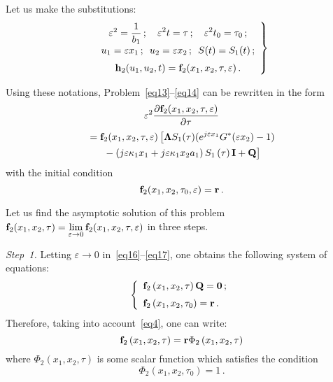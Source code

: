 \begin{multicols}{2}
Let us make the substitutions:
\begin{equation}
\left.
\begin{array}{c}
\varepsilon^2=\displaystyle\frac{\displaystyle 1\mathstrut}{\displaystyle b_1\mathstrut}\,;\quad
\varepsilon^2 t=\tau\,;\quad
\varepsilon^2 t_0=\tau_0\,;\\[6pt] 
u_1=\varepsilon x_1\,;\enskip 
u_2=\varepsilon x_2\,;\enskip 
S(t)=S_1(t)\,;\\[6pt] 
{\bf h}_2(u_1,u_2,t)={\bf f}_2(x_1,x_2,\tau,\varepsilon)\,.
\end{array}
\right\}
\label{eq15}
\end{equation}

Using these notations, Problem~\eqref{eq13}--\eqref{eq14} can be rewritten in the form
\begin{multline}
\varepsilon^2\fr{\partial {\bf f}_2(x_1,x_2,\tau,\varepsilon)}{\partial \tau}\\
{}=
{\bf{f}}_2(x_1,x_2,\tau,\varepsilon)\left[
\mathbf{\Lambda} S_1(\tau)(e^{j\varepsilon x_1}G^*(\varepsilon x_2)-1)\right. 
\\
\left.{} -\left( j\varepsilon\kappa_1x_1+j\varepsilon\kappa_1x_2a_1\right)
S_1\left( \tau\right) \mathbf{I}+ \mathbf{Q}
\vphantom{e^{j\varepsilon x_1}G^*(\varepsilon x_2)}
\right]
\label{eq16}
\end{multline}
with the initial condition
\begin{equation}
\label{eq17}
{\bf f}_2(x_1,x_2,\tau_0,\varepsilon)={\bf r}\,.
\end{equation}

Let us find the asymptotic solution of this problem 
${\bf f}_2(x_1,x_2,\tau)=
\lim\limits_{\varepsilon\to 0}{\bf f}_2(x_1,x_2,\tau,\varepsilon)$ in three steps.

\textit{Step~1.} Letting $\varepsilon\to 0$ in~\eqref{eq16}--\eqref{eq17}, 
one obtains the following system of equations:
$$
\left\{
\begin{array}{l}
{\bf f}_2\left(x_1,x_2,\tau\right)\mathbf{Q}=\mathbf{0}\,; \\[6pt]
{\bf f}_2\left(x_1,x_2,\tau_0\right)={\bf r}\,.
\end{array}
\right.
$$
Therefore, taking into account~\eqref{eq4}, one can write:
\begin{equation}
\label{eq18}
{\bf f}_2\left(x_1,x_2,\tau\right)={\bf r}\Phi_2\left(x_1,x_2,\tau\right)
\end{equation}
where $\Phi_2(x_1,x_2,\tau)$  is some scalar function which satisfies the condition
\begin{equation}
\label{eq19}
\Phi_2\left(x_1,x_2,\tau_0\right)=1\,.
\end{equation}


\end{multicols}
